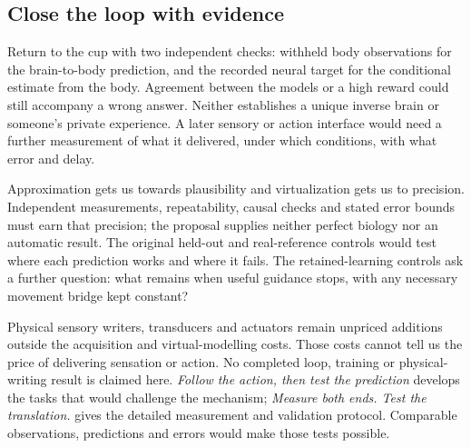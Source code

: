 \subsection{Close the loop with evidence}
Return to the cup with two independent checks: withheld body observations
for the brain-to-body prediction, and the recorded neural target for the
conditional estimate from the body. Agreement between the models or a high
reward could still accompany a wrong answer. Neither establishes a unique
inverse brain or someone's private experience. A later sensory or action
interface would need a further measurement of what it delivered, under which
conditions, with what error and delay.

Approximation gets us towards plausibility and virtualization gets us to
precision. Independent measurements, repeatability, causal checks and stated
error bounds must earn that precision; the proposal supplies neither perfect
biology nor an automatic result. The original held-out and real-reference
controls would test where each prediction works and where it fails. The
retained-learning controls ask a further question: what remains when useful
guidance stops, with any necessary movement bridge kept constant?

Physical sensory writers, transducers and actuators remain unpriced additions
outside the acquisition and virtual-modelling costs. Those costs cannot tell us
the price of delivering sensation or action. No completed loop, training or
physical-writing result is claimed here. \emph{Follow the action, then test the
prediction} develops the tasks that would challenge the mechanism;
\emph{Measure both ends. Test the translation.} gives the detailed measurement
and validation protocol. Comparable observations, predictions and errors would make those tests possible.
